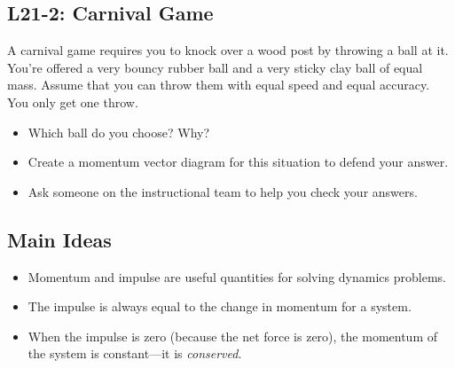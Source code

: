 \documentclass[]{article}
\newcommand{\Week}{21}
\begin{document}
\begin{PresentSpace}
\vspace{-10pt}
\section*{L\Week-2: Carnival Game}
\vspace{-5pt}
A carnival game requires you to knock over a wood post by throwing a ball at it. You're offered a very bouncy rubber ball and a very sticky clay ball of equal mass. Assume that you can throw them with equal speed and equal accuracy. You only get one throw.
\begin{itemize}
	\item Which ball do you choose? Why?
	\item Create a momentum vector diagram for this situation to defend your answer.
	\item Ask someone on the instructional team to help you check your answers.
\end{itemize}
\end{PresentSpace}
\newpage
\begin{TeacherMargin}
	
\end{TeacherMargin}
\begin{PresentSpace}
\section*{Main Ideas}
\begin{itemize}
	\item Momentum and impulse are useful quantities for solving dynamics problems.
	\item The impulse is always equal to the change in momentum for a system.
	\item When the impulse is zero (because the net force is zero), the momentum of the system is constant---it is \textit{conserved}.
\end{itemize}
\end{PresentSpace}
\end{document}
